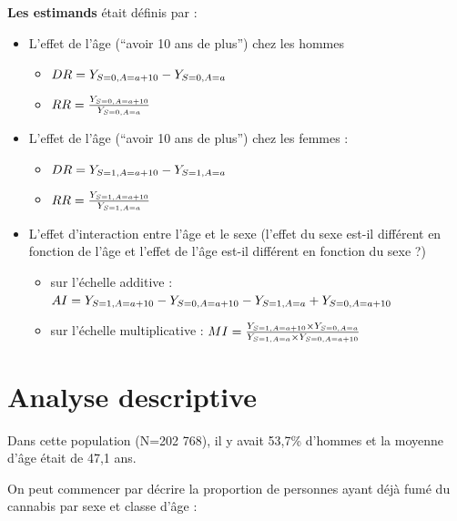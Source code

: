 \documentclass[
]{book}
\providecommand{\tightlist}{%
  \setlength{\itemsep}{0pt}\setlength{\parskip}{0pt}}
\begin{document}
\textbf{Les estimands} était définis par :

\begin{itemize}
\tightlist
\item
  L'effet de l'âge (``avoir 10 ans de plus'') chez les hommes

  \begin{itemize}
  \tightlist
  \item
    \(\small DR = Y_{S=0,A=a+10} - Y_{S=0,A=a}\)
  \item
    \(\small RR = \frac{Y_{S=0,A=a+10}}{Y_{S=0,A=a}}\)
  \end{itemize}
\item
  L'effet de l'âge (``avoir 10 ans de plus'') chez les femmes :

  \begin{itemize}
  \tightlist
  \item
    \(\small DR = Y_{S=1,A=a+10} - Y_{S=1,A=a}\)
  \item
    \(\small RR = \frac{Y_{S=1,A=a+10}}{Y_{S=1,A=a}}\)
  \end{itemize}
\item
  L'effet d'interaction entre l'âge et le sexe (l'effet du sexe est-il différent en fonction de l'âge et l'effet de l'âge est-il différent en fonction du sexe ?)

  \begin{itemize}
  \tightlist
  \item
    sur l'échelle additive : \(\small AI = Y_{S=1,A=a+10} - Y_{S=0,A=a+10} - Y_{S=1,A=a} + Y_{S=0,A=a+10}\)
  \item
    sur l'échelle multiplicative : \(\small MI =\frac{Y_{S=1,A=a+10} \times Y_{S=0,A=a}}{Y_{S=1,A=a} \times Y_{S=0,A=a+10}}\)
  \end{itemize}
\end{itemize}

\hypertarget{analyse-descriptive-1}{%
\section{Analyse descriptive}\label{analyse-descriptive-1}}

Dans cette population (N=202 768), il y avait 53,7\% d'hommes et la moyenne d'âge était de 47,1 ans.

On peut commencer par décrire la proportion de personnes ayant déjà fumé du cannabis par sexe et classe d'âge :
\end{document}
